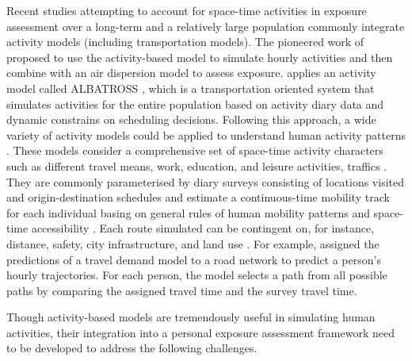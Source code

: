 \documentclass[]{article}
\begin{document}
Recent studies attempting to account for space-time activities in exposure assessment over a long-term and a relatively large population commonly integrate activity models (including transportation models). The pioneered work of \cite{beckx2009dynamic} proposed to use the activity-based model to simulate hourly activities and then combine with an air dispersion model to assess exposure. \cite{beckx2009dynamic} applies an activity model called ALBATROSS \citep{ALBATROSS}, which is a transportation oriented system that simulates activities for the entire population based on activity diary data and dynamic constrains on scheduling decisions. Following this approach, a wide variety of activity models could be applied to understand human activity patterns \citep{w2016multi,miller2003prototype, shekarrizfard2017regional, deffner2016personal,gulliver2005time,dons2011impact}. These models consider a comprehensive set of space-time activity characters such as different travel means, work, education, and leisure activities, traffics \citep{w2016multi}. They are commonly parameterised by diary surveys consisting of locations visited and origin-destination schedules and estimate a continuous-time mobility track for each individual basing on general rules of human mobility patterns and space-time accessibility \citep{nguyen2011steps,gonzalez2008understanding,yang2010using,yu2006spatio,alessandretti2017multi,miller1991modelling}. Each route simulated can be contingent on, for instance, distance, safety, city infrastructure, and land use \citep{law2014measuring}. For example, \cite{shekarrizfard2017regional} assigned the predictions of a travel demand model to a road network to predict a person's hourly trajectories. For each person, the model selects a path from all possible paths by comparing the assigned travel time and the survey travel time. 


Though activity-based models are tremendously useful in simulating human activities, their integration into a personal exposure assessment framework need to be developed to address the following challenges.  
\end{document}
